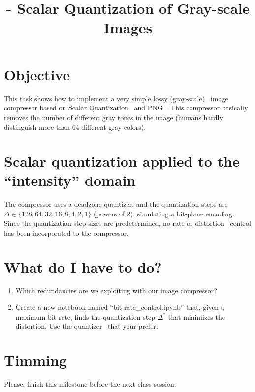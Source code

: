 

\title{\SM{} - Scalar Quantization of Gray-scale Images}

\maketitle
\tableofcontents

\section{Objective}
This task shows how to implement a very simple
\href{https://en.wikipedia.org/wiki/Lossy_compression}{lossy
  (gray-scale)~\cite{vruiz__image_IO} image compressor} based on
Scalar
Quantization~\cite{vruiz__scalar_quantization,sayood2017introduction,vetterli2014foundations}
and PNG~\cite{vruiz__PNG}. This compressor basically removes the
number of different gray tones in the image
(\href{https://en.wikipedia.org/wiki/Visual_system}{humans} hardly
distinguish more than 64 different gray colors).

\section{Scalar quantization applied to the ``intensity'' domain}
The compressor uses a deadzone quantizer, and the quantization steps
are $\Delta\in\{128, 64, 32, 16, 8, 4, 2, 1\}$ (powers of $2$),
simulating a \href{https://en.wikipedia.org/wiki/Bit_plane}{bit-plane}
encoding. Since the quantization step sizes are predetermined, no rate
or distortion~\cite{vruiz__information_theory} control has been
incorporated to the compressor.

\section{What do I have to do?}
\begin{enumerate}
\item Which redundancies are we exploiting with our image compressor? 
\item Create a new notebook named ``bit-rate\_control.ipynb'' that,
  given a maximum bit-rate, finds the quantization step $\Delta^*$
  that minimizes the distortion. Use the
  quantizer~\cite{vruiz__scalar_quantization} that your prefer.
\end{enumerate}

\section{Timming}
Please, finish this milestone before the next class session.

